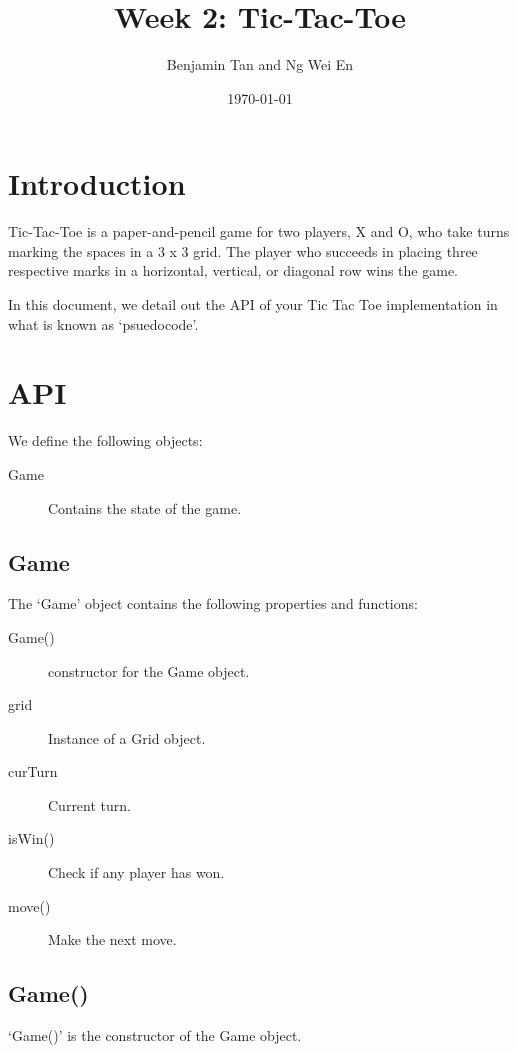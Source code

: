 \documentclass{article}
\title{Week 2: Tic-Tac-Toe}
\author{Benjamin Tan and Ng Wei En}
\date{\today}
\begin{document}
\maketitle

\section{Introduction}

Tic-Tac-Toe is a paper-and-pencil game for two players, X and O, who take turns marking the spaces in a 3 x 3 grid. The player who succeeds in placing three respective marks in a horizontal, vertical, or diagonal row wins the game.

In this document, we detail out the API of your Tic Tac Toe implementation in what is known as `psuedocode'.

\section{API}

We define the following objects:

\begin{description}
  \item[Game] Contains the state of the game.
\end{description}

\subsection{Game}

The `Game' object contains the following properties and functions:

\begin{description}
  \item[Game()] constructor for the Game object.

  \item[grid] Instance of a Grid object.
  \item[curTurn] Current turn.

  \item[isWin()] Check if any player has won.
  \item[move()] Make the next move.
\end{description}

\subsection{Game()}

`Game()' is the constructor of the Game object.
\end{document}
